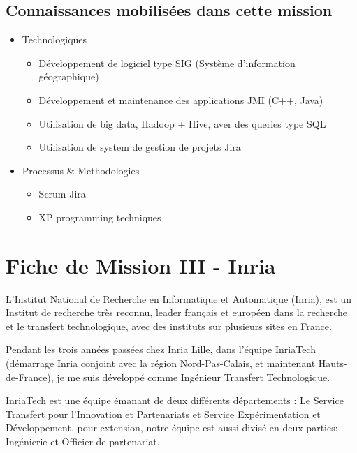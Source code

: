 \documentclass{resume} %
\begin{document}
\subsection {Connaissances mobilisées dans cette mission }
	\begin{itemize} 				
			\item Technologiques 
					\begin{itemize}
						\item Développement de logiciel type SIG (Système d'information géographique)
						\item Développement et maintenance des applications JMI (C++, Java) 
						\item Utilisation de big data, Hadoop + Hive, aver des queries type SQL
						\item Utilisation de system de gestion de projets Jira
					\end {itemize}
			\item Processus \& Methodologies 
					\begin{itemize}
						\item Scrum Jira
						\item XP programming techniques
					\end {itemize}
		\end{itemize}
		




\section{Fiche de Mission III - Inria }

	L'Institut National de Recherche en Informatique et Automatique (Inria), est un Institut de recherche tr\`es reconnu, leader français et européen dans la recherche et le transfert technologique, avec des instituts sur plusieurs sites en  France.
	
         Pendant les trois années passées chez Inria Lille, dans l'équipe InriaTech (démarrage Inria conjoint avec la région Nord-Pas-Calais, et maintenant Hauts-de-France),   je me suis développé comme Ingénieur Transfert Technologique. 
         
    	InriaTech est une équipe émanant de deux différents départements : Le Service Transfert pour l'Innovation et Partenariats et Service Expérimentation et Développement, pour extension, notre équipe est aussi divisé en deux parties: Ingénierie et Officier de partenariat.   
	
\end{document}
